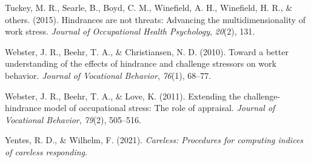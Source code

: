 \documentclass[
  english,
  man]{apa6}
\begin{document}
\leavevmode\hypertarget{ref-tuckey2015hindrances}{}%
Tuckey, M. R., Searle, B., Boyd, C. M., Winefield, A. H., Winefield, H. R., \& others. (2015). Hindrances are not threats: Advancing the multidimensionality of work stress. \emph{Journal of Occupational Health Psychology}, \emph{20}(2), 131.

\leavevmode\hypertarget{ref-webster2010toward}{}%
Webster, J. R., Beehr, T. A., \& Christiansen, N. D. (2010). Toward a better understanding of the effects of hindrance and challenge stressors on work behavior. \emph{Journal of Vocational Behavior}, \emph{76}(1), 68--77.

\leavevmode\hypertarget{ref-webster2011extending}{}%
Webster, J. R., Beehr, T. A., \& Love, K. (2011). Extending the challenge-hindrance model of occupational stress: The role of appraisal. \emph{Journal of Vocational Behavior}, \emph{79}(2), 505--516.

\leavevmode\hypertarget{ref-R-careless}{}%
Yentes, R. D., \& Wilhelm, F. (2021). \emph{Careless: Procedures for computing indices of careless responding}.

\endgroup
\end{document}
